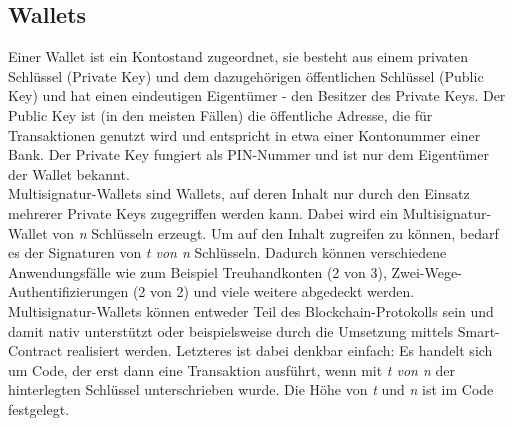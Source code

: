 \subsection{Wallets}
\label{subsec:fundamentals:dlt:wallets}
Einer Wallet ist ein Kontostand zugeordnet, sie besteht aus einem privaten Schlüssel (Private Key) und dem dazugehörigen öffentlichen Schlüssel (Public Key) und hat einen eindeutigen Eigentümer - den Besitzer des Private Keys. Der Public Key ist (in den meisten Fällen) die öffentliche Adresse, die für Transaktionen genutzt wird und entspricht in etwa einer Kontonummer einer Bank. Der Private Key fungiert als PIN-Nummer und ist nur dem Eigentümer der Wallet bekannt.\\
Multisignatur-Wallets sind Wallets, auf deren Inhalt nur durch den Einsatz mehrerer Private Keys zugegriffen werden kann. Dabei wird ein Multisignatur-Wallet von \textit{n} Schlüsseln erzeugt. Um auf den Inhalt zugreifen zu können, bedarf es der Signaturen von \textit{t von n} Schlüsseln. Dadurch können verschiedene Anwendungsfälle wie zum Beispiel Treuhandkonten (2 von 3), Zwei-Wege-Authentifizierungen (2 von 2) und viele weitere abgedeckt werden. \cite{multisig2018}\\
Multisignatur-Wallets können entweder Teil des Blockchain-Protokolls sein und damit nativ unterstützt oder beispielsweise durch die Umsetzung mittels Smart-Contract realisiert werden. Letzteres ist dabei denkbar einfach: Es handelt sich um Code, der erst dann eine Transaktion ausführt, wenn mit \textit{t von n} der hinterlegten Schlüssel unterschrieben wurde. Die Höhe von \textit{t} und \textit{n} ist im Code festgelegt.

